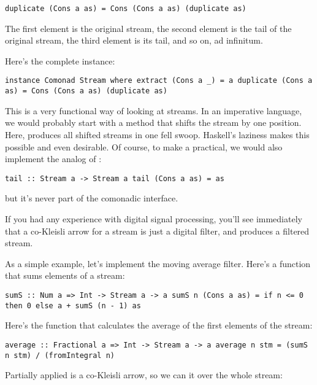 \begin{verbatim}
duplicate (Cons a as) = Cons (Cons a as) (duplicate as)
\end{verbatim}

The first element is the original stream, the second element is the tail
of the original stream, the third element is its tail, and so on, ad
infinitum.

Here's the complete instance:

\begin{verbatim}
instance Comonad Stream where extract (Cons a _) = a duplicate (Cons a as) = Cons (Cons a as) (duplicate as)
\end{verbatim}

This is a very functional way of looking at streams. In an imperative
language, we would probably start with a method  that
shifts the stream by one position. Here,  produces all
shifted streams in one fell swoop. Haskell's laziness makes this
possible and even desirable. Of course, to make a 
practical, we would also implement the analog of :

\begin{verbatim}
tail :: Stream a -> Stream a tail (Cons a as) = as
\end{verbatim}

but it's never part of the comonadic interface.

If you had any experience with digital signal processing, you'll see
immediately that a co-Kleisli arrow for a stream is just a digital
filter, and  produces a filtered stream.

As a simple example, let's implement the moving average filter. Here's a
function that sums  elements of a stream:

\begin{verbatim}
sumS :: Num a => Int -> Stream a -> a sumS n (Cons a as) = if n <= 0 then 0 else a + sumS (n - 1) as
\end{verbatim}

Here's the function that calculates the average of the first 
elements of the stream:

\begin{verbatim}
average :: Fractional a => Int -> Stream a -> a average n stm = (sumS n stm) / (fromIntegral n)
\end{verbatim}

Partially applied  is a co-Kleisli arrow, so we can
 it over the whole stream:

